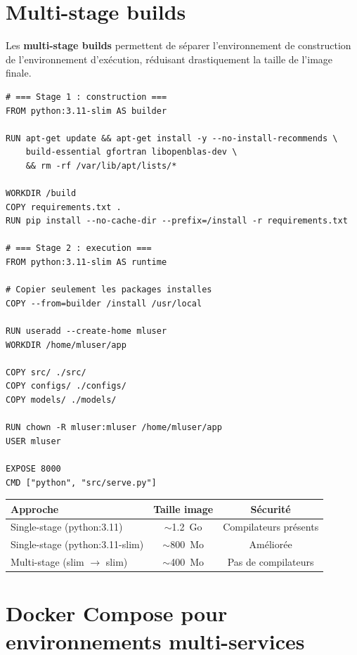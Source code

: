 \section{Multi-stage builds}
\label{sec:multi-stage}

Les \textbf{multi-stage builds} permettent de s\'eparer l'environnement de
construction de l'environnement d'ex\'ecution, r\'eduisant drastiquement la
taille de l'image finale.

\begin{codeblock}[title=\textbf{Multi-stage build pour ML}]
\begin{verbatim}
# === Stage 1 : construction ===
FROM python:3.11-slim AS builder

RUN apt-get update && apt-get install -y --no-install-recommends \
    build-essential gfortran libopenblas-dev \
    && rm -rf /var/lib/apt/lists/*

WORKDIR /build
COPY requirements.txt .
RUN pip install --no-cache-dir --prefix=/install -r requirements.txt

# === Stage 2 : execution ===
FROM python:3.11-slim AS runtime

# Copier seulement les packages installes
COPY --from=builder /install /usr/local

RUN useradd --create-home mluser
WORKDIR /home/mluser/app

COPY src/ ./src/
COPY configs/ ./configs/
COPY models/ ./models/

RUN chown -R mluser:mluser /home/mluser/app
USER mluser

EXPOSE 8000
CMD ["python", "src/serve.py"]
\end{verbatim}
\end{codeblock}

\begin{center}
\begin{tabular}{@{}lcc@{}}
\toprule
\textbf{Approche} & \textbf{Taille image} & \textbf{S\'ecurit\'e} \\
\midrule
Single-stage (python:3.11) & $\sim$1.2~Go & Compilateurs pr\'esents \\
Single-stage (python:3.11-slim) & $\sim$800~Mo & Am\'elior\'ee \\
Multi-stage (slim $\to$ slim) & $\sim$400~Mo & Pas de compilateurs \\
\bottomrule
\end{tabular}
\end{center}

\section{Docker Compose pour environnements multi-services}
\label{sec:docker-compose}
\index{Docker Compose}


